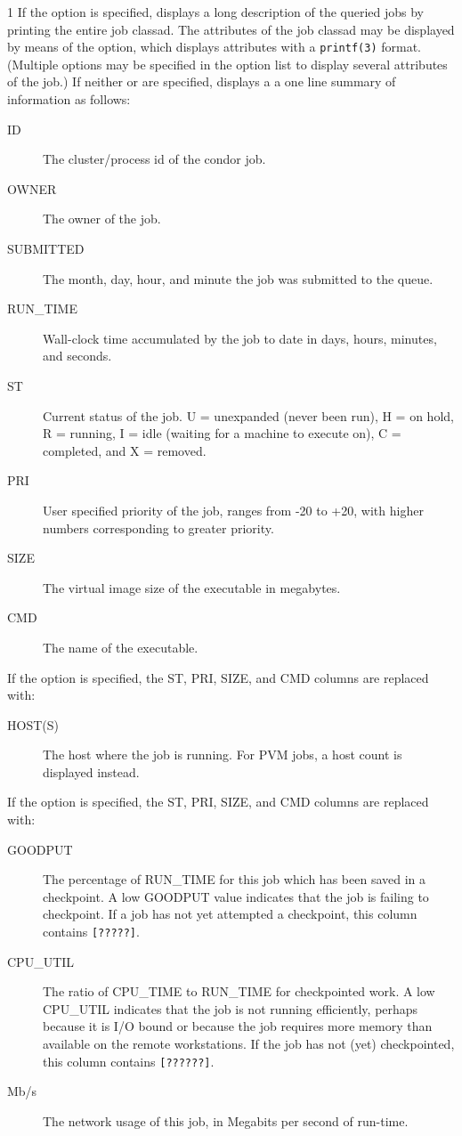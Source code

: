 \begin{ManPage}{\label{man-condor-q}}{1}
If the  option is specified,  displays a long description 
of the queried jobs by printing the entire job classad.
The attributes of the job classad may be displayed by means of the
 option, which displays attributes with a \verb+printf(3)+
format.
(Multiple  options may be specified in the option list to display
several attributes of the job.)
If neither  or  are specified,  displays a 
a one line summary of information as follows:

\begin{description}
\item[ID] The cluster/process id of the condor job. 
\item[OWNER] The owner of the job. 
\item[SUBMITTED] The month, day, hour, and minute the job was submitted to the 
	queue. 
\item[RUN\_TIME]  Wall-clock time accumulated by the job to date in days, 
	hours, minutes, and seconds.  
\item[ST] Current status of the job. U = unexpanded (never been run), H = on hold,
	R = running, I = idle (waiting for a machine to execute on), C = completed, 
	and X = removed. 
\item[PRI] User specified priority of the job, ranges from -20 to +20, with 
	higher numbers corresponding to greater priority. 
\item[SIZE] The virtual image size of the executable in megabytes. 
\item[CMD] The name of the executable. 
\end{description}

If the  option is specified, the ST, PRI, SIZE, and CMD
columns are replaced with:

\begin{description}
\item[HOST(S)] The host where the job is running.  For PVM jobs, a
host count is displayed instead.
\end{description}

If the  option is specified, the ST, PRI, SIZE, and CMD
columns are replaced with:

\begin{description}
\item[GOODPUT] The percentage of RUN\_TIME for this job which has been
saved in a checkpoint.  A low GOODPUT value indicates that the job is
failing to checkpoint.  If a job has not yet attempted a checkpoint,
this column contains \texttt{[?????]}.
\item[CPU\_UTIL] The ratio of CPU\_TIME to RUN\_TIME for checkpointed
work.  A low CPU\_UTIL indicates that the job is not running
efficiently, perhaps because it is I/O bound or because the job
requires more memory than available on the remote workstations.  If
the job has not (yet) checkpointed, this column contains \texttt{[??????]}.
\item[Mb/s] The network usage of this job, in Megabits per second of
run-time.
\end{description}


\end{ManPage}
